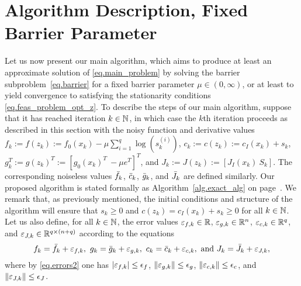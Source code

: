\section{Algorithm Description, Fixed Barrier Parameter}\label{sec.algorithm}

Let us now present our main algorithm, which aims to produce at least an approximate solution of \eqref{eq.main_problem} by solving the barrier subproblem~\eqref{eq.barrier} for a fixed barrier parameter $\mu \in (0,\infty)$, or at least to yield convergence to satisfying the stationarity conditions \eqref{eq.feas_problem_opt_z}.  To describe the steps of our main algorithm, suppose that it has reached iteration $k \in \mathbb{N}$, in which case the $k$th iteration proceeds as described in this section with the noisy function and derivative values $f_k := f(z_k) := f_0(x_k) - \mu \sum_{i=1}^q \log (s_k^{(i)})$, $c_k := c(z_k) := \mbox{$c_I(x_k) + s_k$}$, $g_k^T := g(z_k)^T := [g_0(x_k)^T\ -\mu e^T]^T$, and $J_k := J(z_k) := [J_I(x_k)\ S_k]$.  The corresponding noiseless values ${\bar f}_k$, ${\bar c}_k$, ${\bar g}_k$, and ${\bar J}_k$ are defined similarly.  Our proposed algorithm is stated formally as Algorithm~\ref{alg.exact_alg} on page~\pageref{alg.exact_alg}. We remark that, as previously mentioned, the initial conditions and structure of the algorithm will ensure that $s_k \geq 0$ and $c(z_k) = c_I(x_k) + s_k \geq 0$ for all $k \in \mathbb{N}$.  Let us also define, for all $k \in \mathbb{N}$, the error values $\varepsilon_{f,k} \in \mathbb{R}$, $\varepsilon_{g,k} \in \mathbb{R}^n$, $\varepsilon_{c,k} \in \mathbb{R}^{q}$, and $\varepsilon_{J,k} \in \mathbb{R}^{q \times (n + q)}$ according to the equations
\begin{equation}\label{eq.errors3}
  f_k = {\bar f}_k + \varepsilon_{f,k},\ g_k = {\bar g}_k + \varepsilon_{g,k},\ c_k = {\bar c}_k + \varepsilon_{c,k},\ \text{and}\ J_k = {\bar J}_k + \varepsilon_{J,k},
\end{equation}
where by \eqref{eq.errors2} one has $|\varepsilon_{f,k}| \leq \epsilon_f$, $\|\varepsilon_{g,k}\| \leq \epsilon_g$, $\|\varepsilon_{c,k}\| \leq \epsilon_c$, and $\|\varepsilon_{J,k}\| \leq \epsilon_J$.

